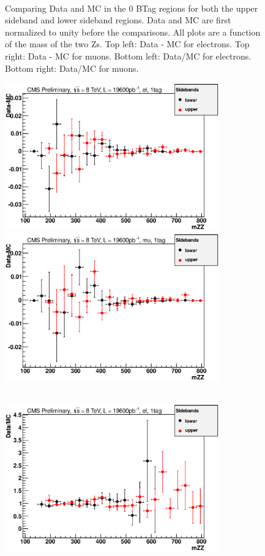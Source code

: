 \begin{figure}[htb!]
{\\
}
\caption{Comparing Data and MC in the 0 BTag regions for both the upper sideband and lower sideband regions. Data and MC are first normalized to unity before the comparisons. All plots are a function of the mass of the two Zs. Top left: Data - MC for electrons.  Top right: Data - MC for muons.  Bottom left: Data/MC for electrons.  Bottom right: Data/MC for muons.
\label{fig:0tag_sideband_up_down}}  
\end{figure}
\begin{figure}[htb!]
\centerline{
\includegraphics[height=2.5in]{Systematics/plots/subtract_el_2_1}
\includegraphics[height=2.5in]{Systematics/plots/subtract_mu_2_1}}
\centerline{
\\
\includegraphics[height=2.5in]{Systematics/plots/divide_el_2_1}
}
\end{figure}
